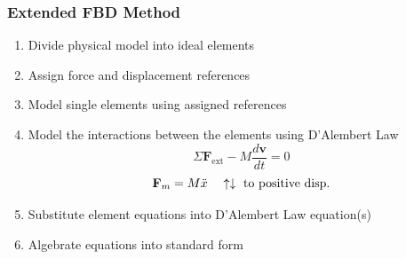\documentclass[twocolumn, 12pt]{article}
\begin{document}
%

%
\subsubsection*{Extended FBD Method}
\begin{enumerate}
    \item Divide physical model into ideal elements
    \item Assign force and displacement references
    \item Model single elements using assigned references
    \item Model the interactions between the elements using D'Alembert Law
        \begin{equation*}
            \Sigma \textbf{F}_{\text{ext}} - M\frac{d\textbf{v}}{dt}=0
        \end{equation*}
        \begin{equation*}
            \textbf{F}_m = M\Ddot{x} \hspace{10pt}\uparrow\downarrow\text{ to positive disp.}
        \end{equation*}
    \item Substitute element equations into D'Alembert Law equation(s)
    \item Algebrate equations into standard form
\end{enumerate}
\end{document}
